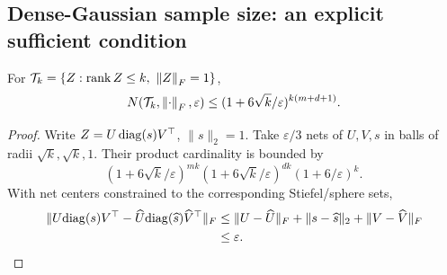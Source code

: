 \subsection{Dense-Gaussian sample size: an explicit sufficient condition}
\begin{lemma}
For $\mathcal T_k=\{Z:\operatorname{rank} Z\leq k,\ \left\lVert Z\right\rVert_F=1\}$,
\begin{equation}
N(\mathcal T_k,\left\lVert\cdot\right\rVert_F,\varepsilon)
\leq(1+6\sqrt{k}/\varepsilon)^{k(m+d+1)} .
\label{eq:rigid-rank-net}
\end{equation}
\end{lemma}
\begin{proof}
Write $Z=U\operatorname{diag}(s)V^\top$, $\|s\|_2=1$.
Take $\varepsilon/3$ nets of $U,V,s$ in balls of radii
$\sqrt{k},\sqrt{k},1$. Their product cardinality is bounded by
\begin{equation}
(1+6\sqrt{k}/\varepsilon)^{mk}
(1+6\sqrt{k}/\varepsilon)^{dk}
(1+6/\varepsilon)^k .
\end{equation}
With net centers constrained to the corresponding Stiefel/sphere sets,
\begin{align}
\|U{\rm diag}(s)V^\top-\widehat U{\rm diag}(\widehat s)\widehat V^\top\|_F
&\leq\|U-\widehat U\|_F+\|s-\widehat s\|_2+\|V-\widehat V\|_F\\
&\leq\varepsilon .
\end{align}
\end{proof}

